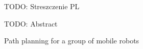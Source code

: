 
TODO: Streszczenie PL

\pagebreak


TODO: Abstract

Path planning for a group of mobile robots

\pagebreak